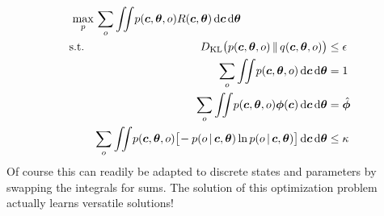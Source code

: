 			\begin{equation*}
				\begin{aligned}
					\max_p \,& \sum_o \iint\! p(\bm{c}, \bm{\theta}, o) R(\bm{c}, \bm{\theta}) \dd{\bm{c}} \dd{\bm{\theta}} \\
					\mathrm{s.t.} \quad&
						\begin{aligned}[t]
							D_\mathrm{KL}\big( p(\bm{c}, \bm{\theta}, o) \,\Vert\, q(\bm{c}, \bm{\theta}, o) \big) &\leq \epsilon \\
							\sum_o \iint\! p(\bm{c}, \bm{\theta}, o) \dd{\bm{c}} \dd{\bm{\theta}} &= 1 \\
							\sum_o \iint\! p(\bm{c}, \bm{\theta}, o) \bm{\phi}(\bm{c}) \dd{\bm{c}} \dd{\bm{\theta}} &= \hat{\bm{\phi}} \\
							\sum_o \iint\! p(\bm{c}, \bm{\theta}, o) \big[\! -p(o \,\vert\, \bm{c}, \bm{\theta}) \ln p(o \,\vert\, \bm{c}, \bm{\theta}) \big] \dd{\bm{c}} \dd{\bm{\theta}} &\leq \kappa
						\end{aligned}
				\end{aligned}
			\end{equation*}
			Of course this can readily be adapted to discrete states and parameters by swapping the integrals for sums. The solution of this optimization problem actually learns versatile solutions!

